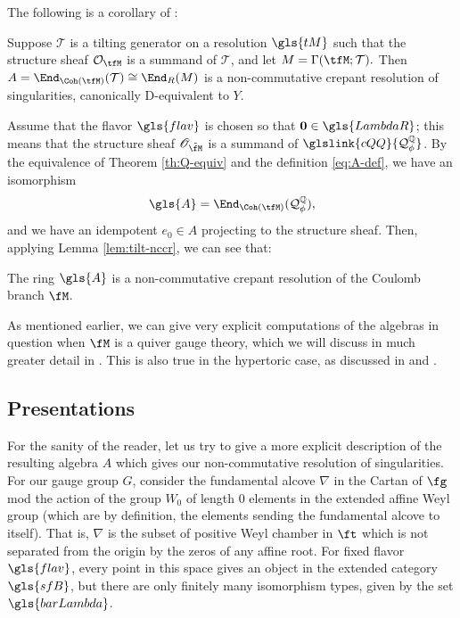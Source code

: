The following is a corollary of \cite[Lem. 3.2.9 \& Prop. 3.2.10]{van2004three}:
\begin{lemma}\label{lem:tilt-nccr}
Suppose $\mathcal{T}$ is a tilting generator on a resolution $\gls{tM}$ such that the structure sheaf $\mathcal{O}_{\tfM}$ is a summand of $\mathcal{T}$, and let $M=\Gamma(\tfM;\mathcal{T}).$ Then $A=\End_{\Coh(\tfM)}(\mathcal{T})\cong \End_R(M)$ is a non-commutative crepant resolution of singularities, canonically D-equivalent to $Y$.  
\end{lemma}

Assume that the flavor $\gls{flav}$ is chosen so that $\mathbf{0}\in \gls{LambdaR}$; this means that the structure sheaf $\mathscr{O}_{\tilde{\fM}}$ is a summand of $\glslink{cQQ}{\mathcal{Q}^{\mathbb{Q}}_\phi}$.  By the equivalence of Theorem \ref{th:Q-equiv} and the definition \eqref{eq:A-def}, we have an isomorphism \[\gls{A}=\End_{\Coh(\tfM)}( \mathcal{Q}^{\mathbb{Q}}_\phi),\] and we have an idempotent $e_0\in A$ projecting to the structure sheaf.     Then, applying Lemma \ref{lem:tilt-nccr}, we can see that:
\begin{corollary}\label{cor:A-nccr}
  The ring $\gls{A}$ is a non-commutative crepant resolution of the Coulomb branch $\fM$.  
\end{corollary}
As mentioned earlier, we can give very explicit computations of the algebras in question when $\fM$ is a quiver gauge theory, which we will discuss in much greater detail in \cite{WebcohII}.  This is also true in the hypertoric case, as discussed in \cite[Prop. 3.35]{McBW} and \cite[\S 4.1]{GMW}.


\subsection{Presentations}
\label{sec:presentations}

For the sanity of the reader, let us try to give a more explicit description of the resulting algebra $A$ which gives our non-commutative resolution of singularities.  For our gauge group $G$, consider the fundamental alcove $\nabla$ in the Cartan of $\fg$ mod the action of the group $\widehat{W}_0$ of length 0 elements in the extended affine Weyl group (which are by definition, the elements sending the fundamental alcove to itself). That is, $\nabla$ is the subset of positive Weyl chamber in $\ft$ which is not separated from the origin by the zeros of any affine root.   For fixed flavor $\gls{flav}$, every point in this space gives an object in the extended category $\gls{sfB}$, but there are only finitely many isomorphism types, given by the set $\gls{barLambda}$.  

